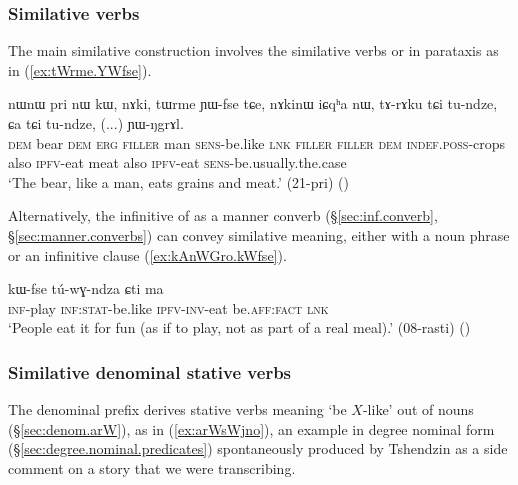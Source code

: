 \subsubsection{Similative verbs} \label{sec:svc.deixis}

The main similative construction involves the similative verbs  or  in parataxis as in (\ref{ex:tWrme.YWfse}).

\begin{exe}
\ex \label{ex:tWrme.YWfse}
\gll nɯnɯ pri nɯ kɯ, nɤki, tɯrme ɲɯ-fse tɕe, nɤkinɯ iɕqʰa nɯ, tɤ-rɤku tɕi tu-ndze, ɕa tɕi tu-ndze, (...)  ɲɯ-ŋgrɤl. \\
\textsc{dem} bear \textsc{dem} \textsc{erg} \textsc{filler} man \textsc{sens}-be.like \textsc{lnk} \textsc{filler} \textsc{filler} \textsc{dem} \textsc{indef}.\textsc{poss}-crops also \textsc{ipfv}-eat meat also \textsc{ipfv}-eat { } \textsc{sens}-be.usually.the.case \\
\glt `The bear, like a man, eats grains and meat.' (21-pri)
()
\end{exe}

Alternatively, the infinitive  of  as a manner converb (§\ref{sec:inf.converb}, §\ref{sec:manner.converbs}) can convey similative meaning, either with a noun phrase or an infinitive clause (\ref{ex:kAnWGro.kWfse}).

\begin{exe}
\ex \label{ex:kAnWGro.kWfse}
\gll [kɤ-ɤnɯɣro] kɯ-fse tú-wɣ-ndza ɕti ma \\
\textsc{inf}-play \textsc{inf}:\textsc{stat}-be.like \textsc{ipfv}-\textsc{inv}-eat be.\textsc{aff}:\textsc{fact} \textsc{lnk} \\
\glt `People eat it for fun (as if to play, not as part of a real meal).' (08-rasti)
()
\end{exe}


\subsubsection{Similative denominal stative verbs} \label{sec:denominal:similative}
The denominal prefix  derives stative verbs meaning `be $X$-like' out of nouns (§\ref{sec:denom.arW}), as in (\ref{ex:arWsWjno}), an example in degree nominal form (§\ref{sec:degree.nominal.predicates}) spontaneously produced by Tshendzin as a side comment on a story that we were transcribing.

